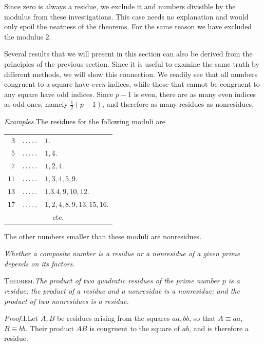 Since zero is always a residue, we exclude it and numbers divisible by the modulus from these investigations. This case needs no explanation and would only spoil the neatness of the theorems. For the same reason we have excluded the modulus $2$.

Several results that we will present in this section can also be derived from the principles of the previous section. Since it is useful to examine the same truth by different methods, we will show this connection. We readily see that all numbers congruent to a square have \emph{even} indices, while those that cannot be congruent to any square have odd indices. Since $p-1$ is even, there are as many even indices as odd ones, namely $\tfrac12(p-1)$, and therefore as many residues as nonresidues.

\emph{Examples.}\quad The residues for the following moduli are
\begin{center}
\begin{tabular}{@{}r@{\quad}c@{\quad}l@{}}
$3$ & $\mathinner{\ldotp\ldotp\ldotp\ldotp\ldotp}$ & $1.$\\
$5$ & $\mathinner{\ldotp\ldotp\ldotp\ldotp\ldotp}$ & $1,4.$\\
$7$ & $\mathinner{\ldotp\ldotp\ldotp\ldotp\ldotp}$ & $1,2,4.$\\
$11$ & $\mathinner{\ldotp\ldotp\ldotp\ldotp\ldotp}$ & $1,3,4,5,9.$\\
$13$ & $\mathinner{\ldotp\ldotp\ldotp\ldotp\ldotp}$ & $1.3.4,9,10,12.$\\
$17$ & $\mathinner{\ldotp\ldotp\ldotp\ldotp},$ & $1,2,4,8,9,13,15,16.$\\
\multicolumn{3}{c}{etc.}
\end{tabular}
\end{center}
The other numbers smaller than these moduli are nonresidues.

\begin{center}\small\emph{Whether a composite number is a residue or a nonresidue of a given prime depends on its factors.}\end{center}

\textsc{Theorem.}\quad \emph{The product of two quadratic residues of the prime number $p$ is a residue; the product of a residue and a nonresidue is a nonresidue; and the product of two nonresidues is a residue.}

\emph{Proof.}\quad I.\quad Let $A,B$ be residues arising from the squares $aa,bb$, so that $A\equiv aa$, $B\equiv bb$. Their product $AB$ is congruent to the square of $ab$, and is therefore a residue.

